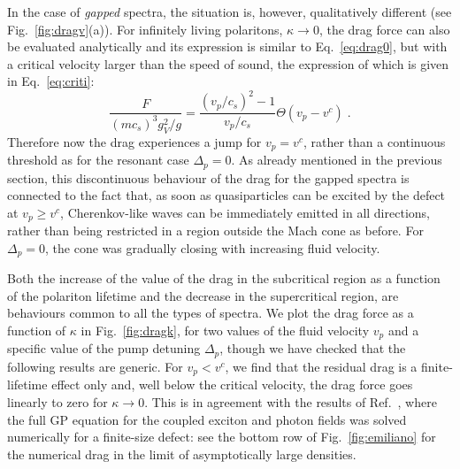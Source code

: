In the case of \emph{gapped} spectra, the situation is, however,
qualitatively different (see Fig.~\ref{fig:dragv}(a)). For infinitely
living polaritons, $\kappa \to 0$, the drag force can also be
evaluated analytically and its expression is similar to
Eq.~\eqref{eq:drag0}, but with a critical velocity larger than the
speed of sound, the expression of which is given in
Eq.~\eqref{eq:criti}:
%
\begin{equation}
  \frac{F}{(mc_s)^3 g_V^2/g}=\frac{(v_p/c_s)^2 - 1}{v_p/c_s}
  \Theta(v_p - v^c)\; .
\end{equation}
%
Therefore now the drag experiences a jump for $v_p=v^c$, rather than a
continuous threshold as for the resonant case $\Delta_p=0$. As already
mentioned in the previous section, this discontinuous behaviour of the
drag for the gapped spectra is connected to the fact that, as soon as
quasiparticles can be excited by the defect at $v_p\ge v^c$,
Cherenkov-like waves can be immediately emitted in all directions,
rather than being restricted in a region outside the Mach cone as
before. For $\Delta_p=0$, the cone was gradually closing with
increasing  fluid velocity.

Both the increase of the value of the drag in the subcritical region
as a function of the polariton lifetime and the decrease in the
supercritical region, are behaviours common to all the types of
spectra. We plot the drag force as a function of $\kappa$ in
Fig.~\ref{fig:dragk}, for two values of the fluid velocity $v_p$ and a
specific value of the pump detuning $\Delta_p$, though we have checked
that the following results are generic. For $v_p < v^c$, we find that
the residual drag is a finite-lifetime effect only and, well below the
critical velocity, the drag force goes linearly to zero for
$\kappa \to 0$. This is in agreement with the results of
Ref.~\cite{Cancellieri_2010}, where the full GP equation for the
coupled exciton and photon fields was solved numerically for a
finite-size defect: see the bottom row of Fig.~\ref{fig:emiliano} for
the numerical drag in the limit of asymptotically large densities.

